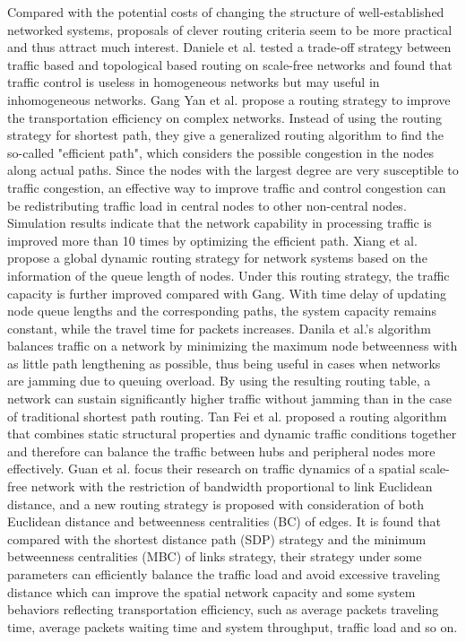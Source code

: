 \documentclass[onecolumn,preprintnumbers,amsmath,amssymb]{revtex4}
\begin{document}
Compared with the potential costs of changing the structure of well-established networked systems, proposals of clever routing criteria seem to be more practical
and thus attract much interest.
Daniele et al. tested a trade-off strategy between traffic based and topological based
routing on scale-free networks and found that traffic control is useless in homogeneous networks but may useful in inhomogeneous networks\cite{DDL}. 
Gang Yan et al. propose a routing strategy to improve the transportation efficiency on complex networks. Instead of using the routing strategy for shortest path, they give a generalized routing algorithm to find the so-called "efficient path", which considers the possible congestion in the nodes along actual paths. Since the nodes with the
largest degree are very susceptible to traffic congestion, an effective way to improve traffic and control congestion can be redistributing traffic load in central nodes to other non-central nodes. Simulation results indicate that the network capability in processing traffic is improved more than 10 times by optimizing the efficient path\cite{GYT}.
Xiang et al. propose a global dynamic routing strategy for network systems based on the information of the queue length of nodes. Under this routing strategy, the traffic
capacity is further improved compared with Gang\cite{GYT}. With time delay of updating node queue lengths and the corresponding paths, the system capacity remains constant, while the travel time for packets increases\cite{XLM}.
Danila et al.'s algorithm balances traffic on a network by minimizing the maximum node betweenness with as little path lengthening as possible, thus being useful in cases when networks are jamming due to queuing overload. By using the resulting routing table, a network can sustain significantly higher traffic without jamming than in the case of traditional shortest path routing\cite{BDY}.
Tan Fei et al. proposed a routing algorithm that combines static structural properties and dynamic traffic conditions together and therefore can balance the traffic between hubs and peripheral nodes more effectively\cite{FTY}.
Guan et al. focus their research on traffic dynamics of a spatial scale-free network with the restriction of bandwidth proportional to link Euclidean distance, and a new routing strategy is proposed with consideration of both Euclidean distance and betweenness centralities (BC) of edges. It is found that compared with the shortest distance path (SDP) strategy and the minimum betweenness centralities (MBC) of links strategy, their strategy under some parameters can efficiently balance the traffic load and avoid excessive traveling distance which can improve the spatial network capacity and some system behaviors reflecting transportation efficiency, such as average packets traveling time, average packets waiting time and system throughput, traffic load and so on\cite{XLMD}.
\end{document}
